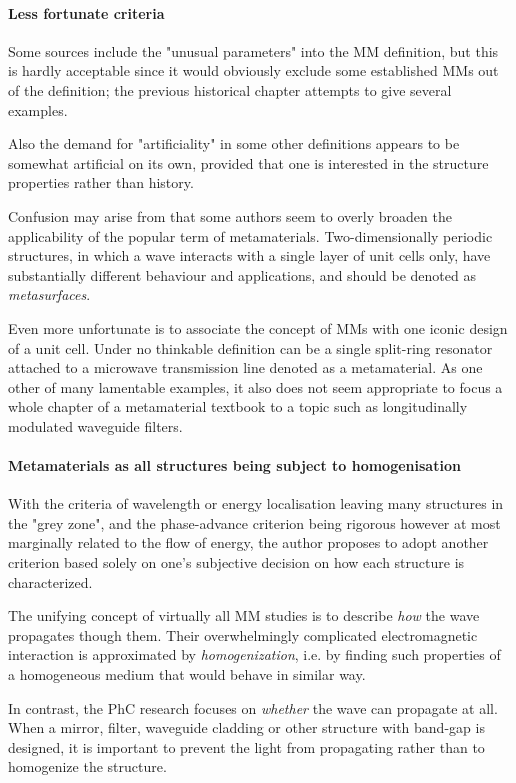 \paragraph{Less fortunate criteria} %
Some sources include the "unusual parameters" into the MM definition, but this is hardly acceptable since it would obviously exclude some established MMs out of the definition; the previous historical chapter attempts to give several examples. 

Also the demand for "artificiality" in some other definitions appears to be somewhat artificial on its own, provided that one is interested in the structure properties rather than history.
 
Confusion may arise from that some authors seem to overly broaden the applicability of the popular term of metamaterials. Two-dimensionally periodic structures, in which a wave interacts with a single layer of unit cells only, have substantially different behaviour and applications, and should be denoted as \textit{metasurfaces}.

Even more unfortunate is to associate the concept of MMs with one iconic design of a unit cell. Under no thinkable definition can be a single split-ring resonator attached to a microwave transmission line denoted as a metamaterial. As one other of many lamentable examples, it also does not seem appropriate to focus a whole chapter of a metamaterial textbook %
to a topic such as longitudinally modulated waveguide filters.

\paragraph{Metamaterials as all structures being subject to homogenisation} %
With the criteria of wavelength or energy localisation leaving many structures in the "grey zone", and the phase-advance criterion being rigorous however at most marginally related to the flow of energy, the author proposes to adopt another criterion based solely on one's subjective decision on how each structure is characterized. 

The unifying concept of virtually all MM studies is to describe \textit{how} the wave propagates though them. Their overwhelmingly complicated electromagnetic interaction is approximated by \textit{homogenization}, i.e. by finding such properties of a homogeneous medium that would behave in similar way.

In contrast, the PhC research focuses on \textit{whether} the wave can propagate at all. When a mirror, filter, waveguide cladding or other structure with band-gap is designed, it is important to prevent the light from propagating rather than to homogenize the structure. 

